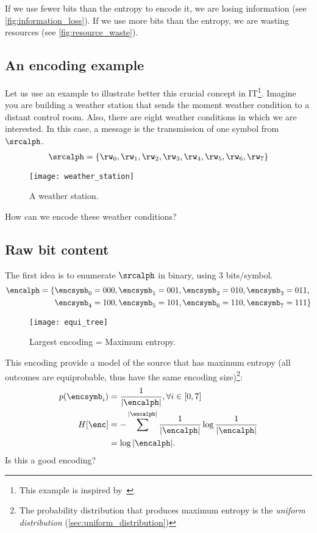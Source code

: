 If we use fewer bits than the entropy to encode it, we are losing information (see \cref{fig:information_loss}). If we use more bits than the entropy, we are wasting resources (see \cref{fig:resource_waste}).
\subsection{An encoding example}
Let us use an example to illustrate better this crucial concept in \ac{IT}\footnote{This example is inspired by~\citeauthor{geron:2018}}. Imagine you are building a weather station that sends the moment weather condition to a distant control room. Also, there are eight weather conditions in which we are interested. In this case, a message is the transmission of one symbol from \(\srcalph\).
\begin{align}
	\srcalph = \{\rw_0, \rw_1, \rw_2, \rw_3, \rw_4, \rw_5, \rw_6, \rw_7\}
\end{align}
\begin{figure}
	[hbt!] \centering
	\texttt{[image: weather\_station]}
	\caption{A weather station.}\label{fig:weather_station} \end{figure}
How can we encode these weather conditions?

\subsection{Raw bit content} The first idea is to enumerate \(\srcalph\) in binary, using 3 bits/symbol.
\begin{align}
	\encalph = \{&\encsymb_0=000, \encsymb_1=001, \encsymb_2=010, \encsymb_3=011, \nonumber \\
	&\encsymb_4=100, \encsymb_5=101, \encsymb_6=110, \encsymb_7=111\} \label{example_encoding}
\end{align}
\begin{figure}
	[ht!] \centering
	\texttt{[image: equi\_tree]}
	\caption{Largest encoding = Maximum entropy.}\label{fig:equi_tree} \end{figure}
This encoding provide a model of the source that has maximum entropy (all outcomes are equiprobable, thus have the same encoding size)\footnote{The probability distribution that produces maximum entropy is the \emph{uniform distribution} (\cref{sec:uniform_distribution})}:
\begin{align}
	p(\encsymb_i)&=\frac{1}{|\encalph|}, \forall i \in [0,7]\\
	H[\enc]&= - \sum^{|\encalph|}\frac{1}{|\encalph|} \log \frac{1}{|\encalph|}\\
	&= \log |\encalph|.
\end{align}
Is this a good encoding?

